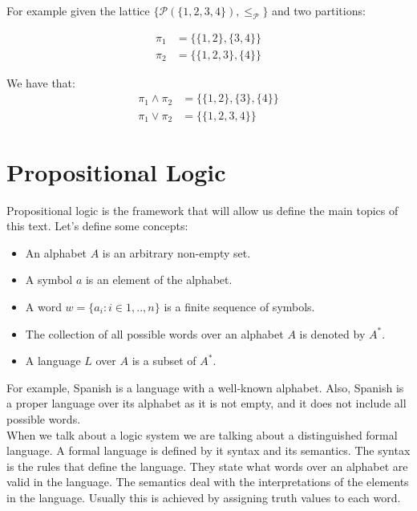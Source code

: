For example given the lattice $\{\mathcal{P}(\{1,2,3,4\}),\le_{\mathcal{P}}\}$ and two partitions:

\begin{equation}
    \begin{split}
      \pi_1 & = \{\{1,2\},\{3,4\}\}\\
      \pi_2 & = \{\{1,2,3\},\{4\}\}
\end{split}
\end{equation}

We have that:
\begin{equation}
    \begin{split}
      \pi_1\land\pi_2 & = \{\{1,2\},\{3\},\{4\}\}\\
      \pi_1\lor\pi_2 & = \{\{1,2,3,4\}\}
\end{split}
\end{equation}



  
\section{Propositional Logic}
Propositional logic is the framework that will allow us define the main topics of this text.  Let's define some concepts:
\begin{itemize}
\item An alphabet $A$ is an arbitrary non-empty set.
\item A symbol $a$ is an element of the alphabet.
\item A word $w = \{a_i:i\in 1,..,n\}$ is a finite sequence of symbols.
\item The collection of all possible words over an alphabet $A$ is denoted by $A^*$.
\item A language $L$ over $A$ is a subset of $A^*$.
\end{itemize}

For example, Spanish is a language with a well-known alphabet. Also, Spanish is a proper language over its alphabet as it is not empty, and it does not include all possible words.\\

When we talk about a logic system we are talking about a distinguished formal language. A formal language is defined by it syntax and its semantics. The syntax is the rules that define the language. They state what words over an alphabet are valid in the language. The semantics deal with the interpretations of the elements in the language. Usually this is achieved by assigning truth values to each word.\\

